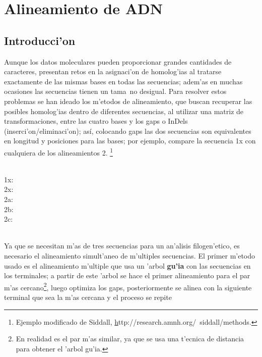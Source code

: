 \chapter{Alineamiento de ADN}
\section*{Introducci'on}
\label{ch:alinear}
% 
% 
Aunque los datos moleculares pueden proporcionar grandes cantidades de caracteres, presentan retos 
en la asignaci'on de homolog'ias al tratarse exactamente de las mismas bases en todas las secuencias; adem'as 
en muchas ocasiones las secuencias tienen un tama~no desigual. 
Para resolver estos problemas se han ideado los m'etodos de alineamiento, que buscan recuperar las posibles homolog'ias 
dentro de diferentes secuencias, al utilizar una matriz de transformaciones, entre las cuatro bases y los gaps o 
InDels (inserci'on/eliminaci'on); as\'i, colocando gaps las dos secuencias son equivalentes en longitud y  posiciones
 para las bases; por ejemplo, compare la secuencia 1x con cualquiera de los alineamientos 2.
 \footnote{Ejemplo modificado de Siddall, \href{}http://research.amnh.org/~siddall/methods.}\\
\\
\begin{small}
1x: \\
2x: \\
2a: \\
2b: \\
2c: \\
\end{small}
\\
Ya que se necesitan m'as de tres secuencias para un an'alisis filogen'etico, es necesario el alineamiento simult'aneo de 
m'ultiples secuencias. El primer m'etodo usado es el alineamiento m'ultiple que usa un 'arbol \textbf{gu'ia} con las 
secuencias en los terminales; a partir de este 'arbol se hace el primer alineamiento para el par m'as 
cercano\footnote{En realidad es el par m'as similar, ya que se usa una t'ecnica de distancia para obtener el 'arbol gu'ia.}, 
luego optimiza los gaps, posteriormente se alinea con la siguiente terminal que sea la m'as cercana y el proceso se repite 

